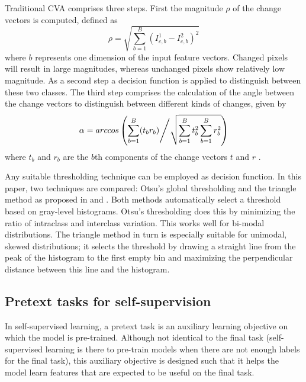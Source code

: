 \documentclass[runningheads]{llncs}
\begin{document}
Traditional \ac{CVA} comprises three steps. First the magnitude $\rho$ of the change vectors is computed, defined as  
\begin{equation}
    \rho = \sqrt{\sum_{b=1}^B (I_{c,b}^1-I_{c,b}^2)^2}
\end{equation}
where $b$ represents one dimension of the input feature vectors. Changed pixels will result in large magnitudes, whereas unchanged pixels show relatively low magnitude. As a second step a decision function is applied to distinguish between these two classes. The third step comprises the calculation of the angle between the change vectors to distinguish between different kinds of changes, given by 
\begin{equation}
    \alpha = arccos \left( \sum_{b=1}^B(t_b r_b) \middle/ \sqrt{\sum_{b=1}^B t_b^2 \sum_{b=1}^B r_b^2} \right)
\end{equation}
where $t_b$ and $r_b$ are the $b$th components of the change vectors $t$ and $r$ \cite{Bovolo:2007:CVA_polar}.

Any suitable thresholding technique can be employed as decision function. In this paper, two techniques are compared: Otsu's global thresholding \cite{Otsu:1979:threshold} and the triangle method as proposed in \cite{Zack:1977:triangle_threshold} and \cite{Rosin:2001:triangle}. Both methods automatically select a threshold based on gray-level histograms. Otsu's thresholding does this by minimizing the ratio of intraclass and interclass variation. This works well for bi-modal distributions. The triangle method in turn is especially suitable for unimodal, skewed distributions; it selects the threshold by drawing a straight line from the peak of the histogram to the first empty bin and maximizing the perpendicular distance between this line and the histogram.
\fi 

\subsection{Pretext tasks for self-supervision}\label{sec:ssl} \label{sec:pretext_tasks}
{In self-supervised learning, a pretext task is an auxiliary learning objective on which the model is pre-trained. Although not identical to the final task (self-supervised learning is there to pre-train models when there are not enough labels for the final task), this auxiliary objective is designed such that it helps the model learn features that are expected to be useful on the final task.}
\end{document}
